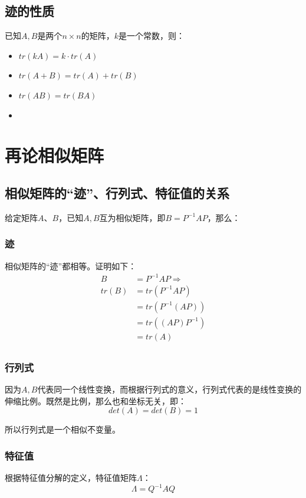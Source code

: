 \documentclass[12pt]{article}
\begin{document}
\subsection{迹的性质}
已知$A,B$是两个$n\times n$的矩阵，$k$是一个常数，则：
\begin{itemize}
\setlength{\itemsep}{0pt}
\setlength{\parsep}{0pt}
\setlength{\parskip}{0pt}
    \item $tr(kA) = k\cdot tr(A)$
    \item $tr(A+B) = tr(A) + tr(B)$
    \item $tr(AB) = tr(BA)$
    \item 
\end{itemize}

\section{再论相似矩阵}
\subsection{相似矩阵的“迹”、行列式、特征值的关系}
给定矩阵$A$、$B$，已知$A,B$互为相似矩阵，即$B = P^{-1}AP$，那么：

\subsubsection{迹}
相似矩阵的“迹”都相等。证明如下：
\begin{align*}
    B &= P^{-1}AP \Rightarrow \\
    tr(B) &= tr(P^{-1}AP) \\
          &= tr(P^{-1}(AP)) \\
          &= tr((AP)P^{-1}) \\
          &= tr(A) \\   
\end{align*}

\subsubsection{行列式}
因为$A,B$代表同一个线性变换，而根据行列式的意义，行列式代表的是线性变换的伸缩比例。既然是比例，那么也和坐标无关，即：
$$
det(A) = det(B) = 1
$$

所以行列式是一个相似不变量。

\subsubsection{特征值}
根据特征值分解的定义，特征值矩阵$\Lambda$：
$$
\Lambda = Q^{-1}AQ
$$
\end{document}
